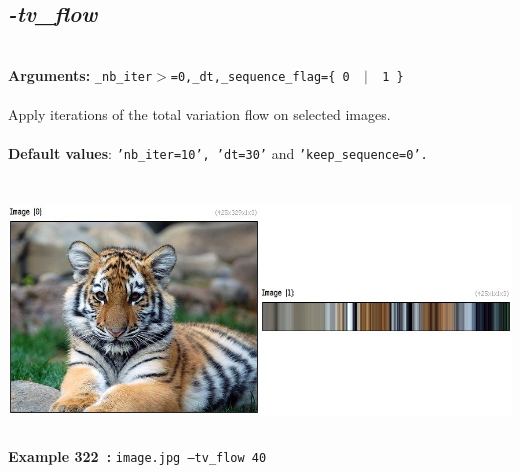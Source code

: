 \documentclass[a4paper,11pt,twoside]{book}
\begin{document}
\subsection{\emph{-tv\_flow} }\vspace*{-0.5em}
~\\\textbf{Arguments: } 
{\small \texttt{\_nb\_iter$>$=0,\_dt,\_sequence\_flag=\{ 0 ~$|$~ 1 \}}}\\~\\
Apply iterations of the total variation flow on selected images.
~\\~\\\textbf{Default values}: {\small \texttt{'nb\_iter=10', 'dt=30'} and \texttt{'keep\_sequence=0'.}}
\begin{center}\includegraphics[keepaspectratio=true,height=7cm,width=\textwidth]{img/gmic_def322.jpg}\\
{\footnotesize \textbf{Example 322~:} \texttt{image.jpg --tv\_flow 40}}
\end{center}
\end{document}
